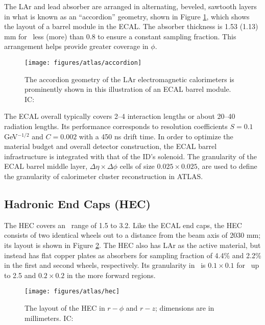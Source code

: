 The LAr and lead absorber are arranged in alternating, beveled, sawtooth layers in what is known as an ``accordion'' geometry, shown in Figure \ref{fig:accordion}, which shows the layout of a barrel module in the ECAL.  The absorber thickness is 1.53 (1.13) mm for \aeta\, less (more) than 0.8 to ensure a constant sampling fraction.  This arrangement helps provide greater coverage in $\phi$.
\begin{figure}[!htbp]\captionsetup{justification=centering}
  \centering
  \texttt{[image: figures/atlas/accordion]}
  \caption{The accordion geometry of the LAr electromagnetic calorimeters is prominently shown in this illustration of an ECAL barrel module.  IC: \cite{jinstpaper}}
  \label{fig:accordion}
\end{figure}

The ECAL overall typically covers 2--4 interaction lengths or about 20--40 radiation lengths.  Its performance corresponds to resolution coefficients $S=0.1$ GeV$^{-1/2}$ and $C=0.002$ with a 450 ns drift time.  In order to optimize the material budget and overall detector construction, the ECAL barrel infrastructure is integrated with that of the ID's solenoid.  The granularity of the ECAL barrel middle layer, $\Delta\eta\times\Delta\phi$ cells of size $0.025\times0.025$, are used to define the granularity of calorimeter cluster reconstruction in ATLAS.

\subsection{Hadronic End Caps (HEC)}
The HEC covers an \aeta \, range of 1.5 to 3.2.  Like the ECAL end caps, the HEC consists of two identical wheels out to a distance from the beam axis of 2030 mm; its layout is shown in Figure \ref{fig:hec}.  The HEC also has LAr as the active material, but instead has flat copper plates as absorbers for sampling fraction of 4.4\% and 2.2\% in the first and second wheels, respectively.  Its granularity in \ephi\, is $0.1\times0.1$ for \aeta\, up to 2.5 and $0.2\times0.2$ in the more forward regions.

\begin{figure}[!htbp]\captionsetup{justification=centering}
  \centering
  \texttt{[image: figures/atlas/hec]}
  \caption{The layout of the HEC in $r-\phi$ and $r-z$; dimensions are in millimeters.  IC: \cite{jinstpaper}}
  \label{fig:hec}
\end{figure}

